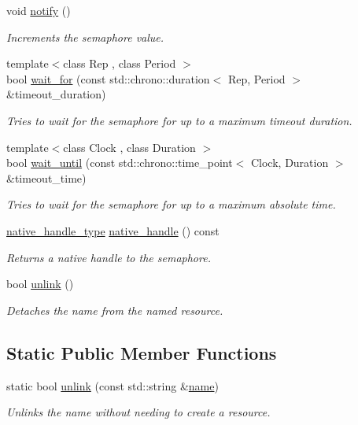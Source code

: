\begin{DoxyCompactItemize}
void \hyperlink{classcpen333_1_1process_1_1posix_1_1semaphore_a1b9043106c5da18ad152bc83e3de1750}{notify} ()
\begin{DoxyCompactList}\small\item\em Increments the semaphore value. \end{DoxyCompactList}\item 
{\footnotesize template$<$class Rep , class Period $>$ }\\bool \hyperlink{classcpen333_1_1process_1_1posix_1_1semaphore_a8015c878067c3d93748d03c58bb1b233}{wait\+\_\+for} (const std\+::chrono\+::duration$<$ Rep, Period $>$ \&timeout\+\_\+duration)
\begin{DoxyCompactList}\small\item\em Tries to wait for the semaphore for up to a maximum timeout duration. \end{DoxyCompactList}\item 
{\footnotesize template$<$class Clock , class Duration $>$ }\\bool \hyperlink{classcpen333_1_1process_1_1posix_1_1semaphore_a83443f24c1b7b11e5384975e9abc77dc}{wait\+\_\+until} (const std\+::chrono\+::time\+\_\+point$<$ Clock, Duration $>$ \&timeout\+\_\+time)
\begin{DoxyCompactList}\small\item\em Tries to wait for the semaphore for up to a maximum absolute time. \end{DoxyCompactList}\item 
\hyperlink{classcpen333_1_1process_1_1posix_1_1semaphore_ad63150e5c8c196a84a7b214462756f1a}{native\+\_\+handle\+\_\+type} \hyperlink{classcpen333_1_1process_1_1posix_1_1semaphore_a1e4a2d5a032a71fc06a5065f0e83a94c}{native\+\_\+handle} () const
\begin{DoxyCompactList}\small\item\em Returns a native handle to the semaphore. \end{DoxyCompactList}\item 
bool \hyperlink{classcpen333_1_1process_1_1posix_1_1semaphore_aa6064e2c4b4b7282cc5e6eda877ee1bb}{unlink} ()
\begin{DoxyCompactList}\small\item\em Detaches the name from the named resource. \end{DoxyCompactList}\end{DoxyCompactItemize}
\subsection*{Static Public Member Functions}
\begin{DoxyCompactItemize}
\item 
static bool \hyperlink{classcpen333_1_1process_1_1posix_1_1semaphore_ab1399175014f674484217be6d465e878}{unlink} (const std\+::string \&\hyperlink{classcpen333_1_1process_1_1impl_1_1named__resource__base_a53986a0a1dd26a3602b842c45613b79d}{name})
\begin{DoxyCompactList}\small\item\em Unlinks the name without needing to create a resource. \end{DoxyCompactList}\end{DoxyCompactItemize}
